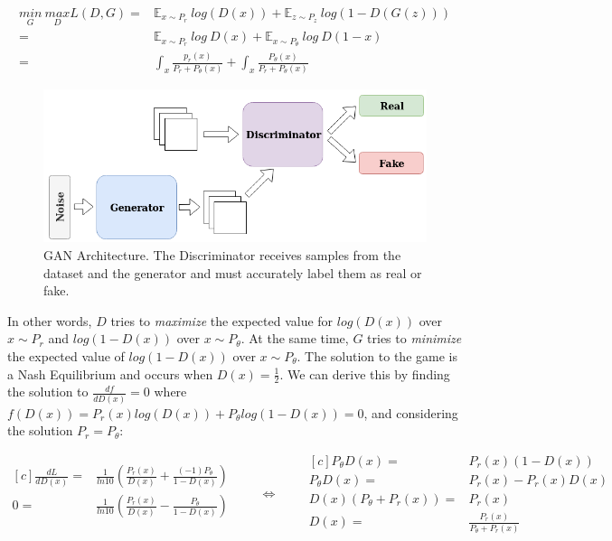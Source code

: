 \begin{align}
	\label{eq:minmax}
	\underset{G}{min}~\underset{D}{max} L(D, G) =& \mathbb{E}_{x \sim P_r}~log(D(x)) + \mathbb{E}_{z \sim P_z}~log(1-D(G(z))) \nonumber \\
	=& \mathbb{E}_{x \sim P_r}~log~D(x) + \mathbb{E}_{x \sim P_\theta}~log~D(1-x) \nonumber \\ 
	=& \int_{x}^{} \frac{p_r(x)}{P_r + P_\theta(x)} + \int_{x}^{} \frac{P_\theta(x)}{P_r + P_\theta(x)} 
\end{align}

\begin{figure}[h!]
	\centering
	\includegraphics[width=0.8\linewidth]{media/gan.png}
	\caption{GAN Architecture. The Discriminator receives samples from the dataset and the generator and must accurately label them as real or fake.}
	\label{fig:gan}
\end{figure}

In other words, $D$ tries to \textit{maximize} the expected value for $log(D(x))$ over $x \sim P_r$ and $log(1-D(x))$ over $x \sim P_\theta$. At the same time, $G$ tries to \textit{minimize} the expected value of $log(1-D(x))$ over $x \sim P_\theta$. The solution to the game is a Nash Equilibrium and occurs when $D(x)=\frac{1}{2}$. We can derive this by finding the solution to $\frac{d f}{d D(x)} = 0$ where $f(D(x)) = P_r(x) log(D(x)) + P_\theta log(1-D(x)) = 0$, and considering the solution $P_r = P_\theta$: 

\begin{equation}
	\label{eq:optD}
	\begin{aligned}[c]
		\frac{d L}{d D(x)} =& \frac{1}{ln10} \left( \frac{P_r(x)}{D(x)} + \frac{(-1)P_\theta}{1-D(x)} \right) \\
		0 =& \frac{1}{ln10} \left( \frac{P_r(x)}{D(x)} - \frac{P_\theta}{1-D(x)} \right) \\
	\end{aligned}
	\qquad\Longleftrightarrow\qquad
	\begin{aligned}[c]
		P_\theta D(x) =& P_r(x) (1-D(x)) \\
		P_\theta D(x) =& P_r(x)-P_r(x) D(x) \\
		D(x)(P_\theta + P_r(x)) =& P_r(x) \\
		D(x) =& \frac{P_r(x)}{P_\theta + P_r(x)} 
	\end{aligned}
\end{equation}

